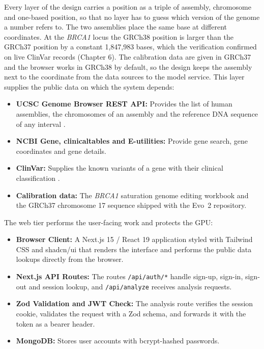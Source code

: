 \vspace{-2pt}
\begin{figure}\centering\setlength{\diagH}{0.82\portw}\diagArch\par\vspace{-2pt}\label{fig:4.1}\end{figure}
\vspace{-2pt}
Every layer of the design carries a position as a triple of assembly, chromosome and one-based position, so that no layer has to guess which version of the genome a number refers to. The two assemblies place the same base at different coordinates. At the \textit{BRCA1} locus the GRCh38 position is larger than the GRCh37 position by a constant 1,847,983 bases, which the verification confirmed on live ClinVar records (Chapter 6). The calibration data are given in GRCh37 and the browser works in GRCh38 by default, so the design keeps the assembly next to the coordinate from the data sources to the model service.
This layer supplies the public data on which the system depends:
\begin{itemize}
\item \textbf{UCSC Genome Browser REST API:} Provides the list of human assemblies, the chromosomes of an assembly and the reference DNA sequence of any interval \cite{lee2022ucsc}.
\item \textbf{NCBI Gene, clinicaltables and E-utilities:} Provide gene search, gene coordinates and gene details.
\item \textbf{ClinVar:} Supplies the known variants of a gene with their clinical classification \cite{landrum2024clinvar}.
\item \textbf{Calibration data:} The \textit{BRCA1} saturation genome editing workbook and the GRCh37 chromosome 17 sequence shipped with the Evo~2 repository.
\end{itemize}
\vspace{-2pt}

The web tier performs the user-facing work and protects the GPU:
\begin{itemize}
\item \textbf{Browser Client:} A Next.js 15 / React 19 application styled with Tailwind CSS and shadcn/ui that renders the interface and performs the public data lookups directly from the browser.
\item \textbf{Next.js API Routes:} The routes \texttt{/api/auth/*} handle sign-up, sign-in, sign-out and session lookup, and \texttt{/api/analyze} receives analysis requests.
\item \textbf{Zod Validation and JWT Check:} The analysis route verifies the session cookie, validates the request with a Zod schema, and forwards it with the token as a bearer header.
\item \textbf{MongoDB:} Stores user accounts with bcrypt-hashed passwords.
\end{itemize}

